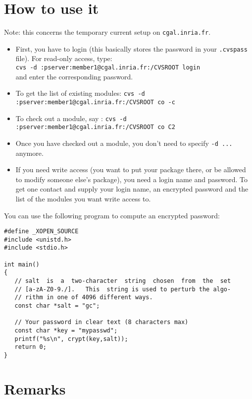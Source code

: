\section{How to use it}
\label{sec:cvs_how_to}

Note: this concerns the temporary current setup on \texttt{cgal.inria.fr}.

\begin{itemize}
\item
    First, you have to login (this basically stores the password in your
    \texttt{.cvspass} file). For read-only access, type: \\
    \texttt{cvs -d :pserver:member1@cgal.inria.fr:/CVSROOT login} \\
    and enter the corresponding password.
\item
    To get the list of existing modules:
    \texttt{cvs -d :pserver:member1@cgal.inria.fr:/CVSROOT co -c} \\
\item
    To check out a module, say :
    \texttt{cvs -d :pserver:member1@cgal.inria.fr:/CVSROOT co C2} \\
\item
    Once you have checked out a module, you don't need to specify
    \texttt{-d ...} anymore.
\item
    If you need write access (you want to put your package there, or be
    allowed to modify someone else's package), you need a
    login name and password. To get one contact 
    and supply your login name, an encrypted password  and the list of 
    the modules you want write access to.
\end{itemize}

You can use the following program to compute an encrypted password:
    
\begin{verbatim}
#define _XOPEN_SOURCE
#include <unistd.h>
#include <stdio.h>

int main()
{
   // salt  is  a  two-character  string  chosen  from  the  set
   // [a-zA-Z0-9./].   This  string is used to perturb the algo-
   // rithm in one of 4096 different ways.
   const char *salt = "gc";

   // Your password in clear text (8 characters max)
   const char *key = "mypasswd";
   printf("%s\n", crypt(key,salt));
   return 0;
}
\end{verbatim}


\section{Remarks}
\label{sec:cvs_remarks}

